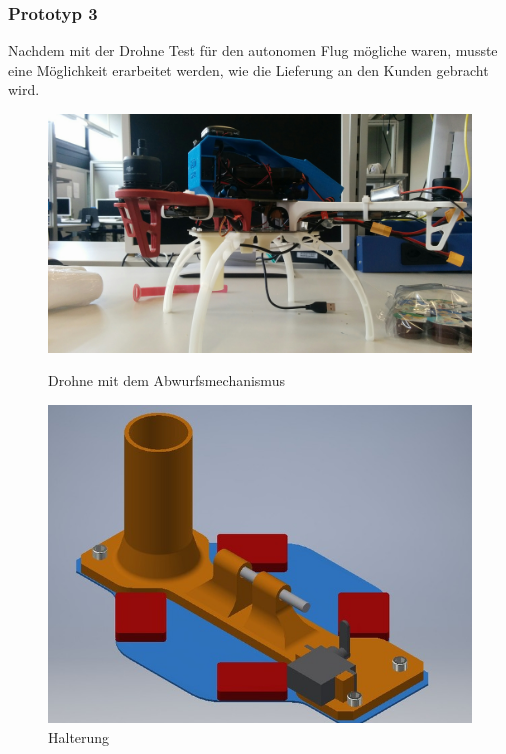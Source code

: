 \subsubsection{Prototyp 3}

Nachdem mit der Drohne Test für den autonomen Flug mögliche waren, musste eine Möglichkeit erarbeitet werden, wie die Lieferung an den Kunden gebracht wird.

\begin{figure}[H]
	\centering
	\begin{minipage}[b]{0.4\textwidth}
		\includegraphics[width=\textwidth]{images/hardware/drone-with-servo.jpg}
		\caption{Drohne mit dem Abwurfsmechanismus}
	\end{minipage}
	\hfill
	\begin{minipage}[b]{0.4\textwidth}
		\includegraphics[width=\textwidth]{images/hardware/parachute-model.jpg}
		\caption{Halterung}
	\end{minipage}
\end{figure}


